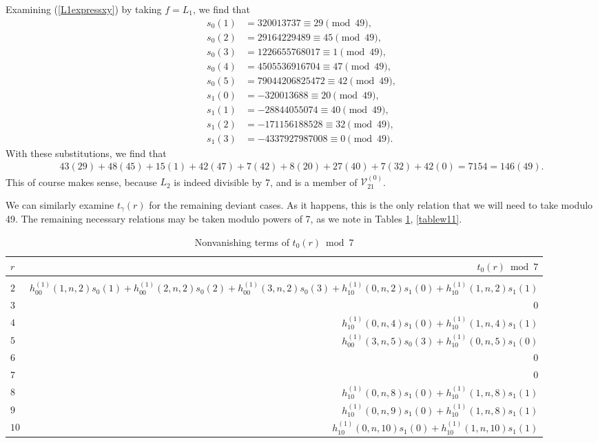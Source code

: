 \documentclass[reqno]{amsart}
\theoremstyle{definition}
\theoremstyle{remark}
\numberwithin{equation}{section}
\begin{document}
Examining (\ref{L1expressxy}) by taking $f=L_1$, we find that
\begin{align*}
s_0(1) &= 320013737\equiv 29\pmod{49},\\
s_0(2) &= 29164229489\equiv 45\pmod{49},\\
s_0(3) &= 1226655768017\equiv 1\pmod{49},\\
s_0(4) &= 4505536916704\equiv 47\pmod{49},\\
s_0(5) &= 79044206825472\equiv 42\pmod{49},\\
s_1(0) &= -320013688\equiv 20\pmod{49},\\
s_1(1) &= -28844055074\equiv 40\pmod{49},\\
s_1(2) &= -171156188528\equiv 32\pmod{49},\\
s_1(3) &= -4337927987008\equiv 0\pmod{49}.
\end{align*}  With these substitutions, we find that
\begin{align}
43 (29) + 48 (45) + 15 (1) + 42 (47) + 7 (42) + 8 (20) + 27 (40) + 7 (32) + 42 (0) = 7154= 146(49).\label{checkingL1forfirst}
\end{align}  This of course makes sense, because $L_2$ is indeed divisible by 7, and is a member of $\mathcal{V}^{(0)}_{21}$.

We can similarly examine $t_{\gamma}(r)$ for the remaining deviant cases.  As it happens, this is the only relation that we will need to take modulo 49.  The remaining necessary relations may be taken modulo powers of 7, as we note in Tables \ref{tablew00}, \ref{tablew11}.

\begin{table}[hbt!]
\begin{center}
\begin{tabular}{l|r}
 $r$      & $t_0(r)\bmod 7$\\
\hline\\
 $2$         & $h^{(1)}_{00}(1,n,2)s_0(1)+h^{(1)}_{00}(2,n,2)s_0(2)+h^{(1)}_{00}(3,n,2)s_0(3)+h^{(1)}_{10}(0,n,2)s_1(0)+h^{(1)}_{10}(1,n,2)s_1(1)$\\
 $3$         & $0$\\
 $4$         & $h^{(1)}_{10}(0,n,4)s_1(0)+h^{(1)}_{10}(1,n,4)s_1(1)$\\
 $5$         & $h^{(1)}_{00}(3,n,5)s_0(3)+h^{(1)}_{10}(0,n,5)s_1(0)$\\
 $6$         & $0$\\
 $7$         & $0$\\
 $8$         & $h^{(1)}_{10}(0,n,8)s_1(0)+h^{(1)}_{10}(1,n,8)s_1(1)$\\
 $9$         & $h^{(1)}_{10}(0,n,9)s_1(0)+h^{(1)}_{10}(1,n,8)s_1(1)$\\
 $10$       & $h^{(1)}_{10}(0,n,10)s_1(0)+h^{(1)}_{10}(1,n,10)s_1(1)$
 \end{tabular}
\vspace{0.2 cm}
\caption{Nonvanishing terms of $t_0(r)\bmod 7$}\label{tablew00}
\end{center}
\end{table}
\end{document}
